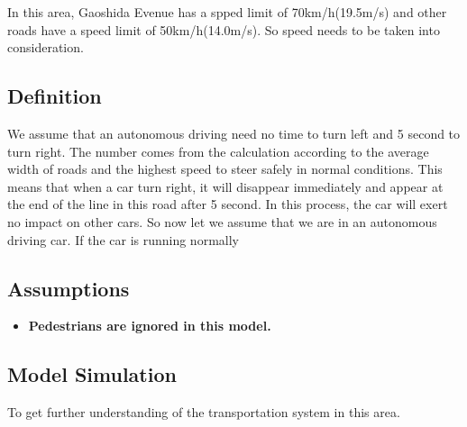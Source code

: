 \documentclass[12pt]{article}
\theoremstyle{definition}
\theoremstyle{remark}
\numberwithin{equation}{section}
\begin{document}
		In this area, Gaoshida Evenue has a spped limit of 70km/h(19.5m/s) and other roads have a speed limit of 50km/h(14.0m/s). So speed needs to be taken into consideration.
		\subsection{Definition}
		We assume that an autonomous driving need no time to turn left and 5 second to turn right. The number comes from the calculation according to the average width of roads and the highest speed to steer safely in normal conditions. This means that when a car turn right, it will disappear immediately and appear at the end of the line in this road after 5 second. In this process, the car will exert no impact on other cars.
		So now let we assume that we are in an autonomous driving car. If the car is running normally
		\subsection{Assumptions}
		\begin{itemize}
			\item \textbf{Pedestrians are ignored in this model.}
		\end{itemize}
	\subsection{Model Simulation}
	To get further understanding of the transportation system in this area.
	
\end{document}
